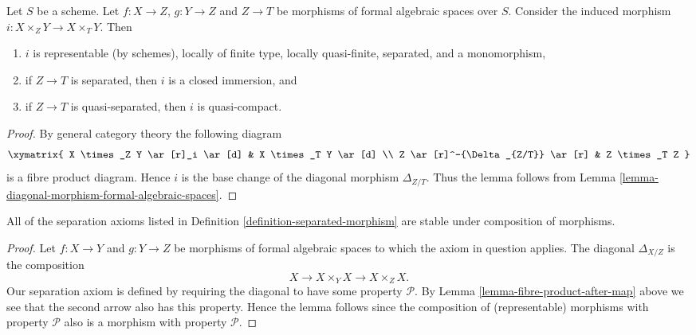 \begin{lemma}
\label{lemma-fibre-product-after-map}
Let $S$ be a scheme. Let $f : X \to Z$, $g : Y \to Z$ and $Z \to T$
be morphisms of formal algebraic spaces over $S$. Consider the induced
morphism $i : X \times_Z Y \to X \times_T Y$. Then
\begin{enumerate}
\item $i$ is representable (by schemes), locally of finite type,
locally quasi-finite, separated, and a monomorphism,
\item if $Z \to T$ is separated, then $i$ is a closed immersion, and
\item if $Z \to T$ is quasi-separated, then $i$ is quasi-compact.
\end{enumerate}
\end{lemma}

\begin{proof}
By general category theory the following diagram
$$
\xymatrix{
X \times_Z Y \ar[r]_i \ar[d] & X \times_T Y \ar[d] \\
Z \ar[r]^-{\Delta_{Z/T}} \ar[r] & Z \times_T Z
}
$$
is a fibre product diagram. Hence $i$ is the base change of the
diagonal morphism $\Delta_{Z/T}$. Thus the lemma follows
from Lemma \ref{lemma-diagonal-morphism-formal-algebraic-spaces}.
\end{proof}

\begin{lemma}
\label{lemma-composition-separated}
All of the separation axioms listed in
Definition \ref{definition-separated-morphism}
are stable under composition of morphisms.
\end{lemma}

\begin{proof}
Let $f : X \to Y$ and $g : Y \to Z$ be morphisms of formal algebraic spaces
to which the axiom in question applies.
The diagonal $\Delta_{X/Z}$ is the composition
$$
X \longrightarrow X \times_Y X \longrightarrow X \times_Z X.
$$
Our separation axiom is defined by requiring the diagonal
to have some property $\mathcal{P}$. By
Lemma \ref{lemma-fibre-product-after-map} above we see that
the second arrow also has this property. Hence the lemma follows
since the composition of (representable) morphisms with property
$\mathcal{P}$ also is a morphism with property $\mathcal{P}$.
\end{proof}

